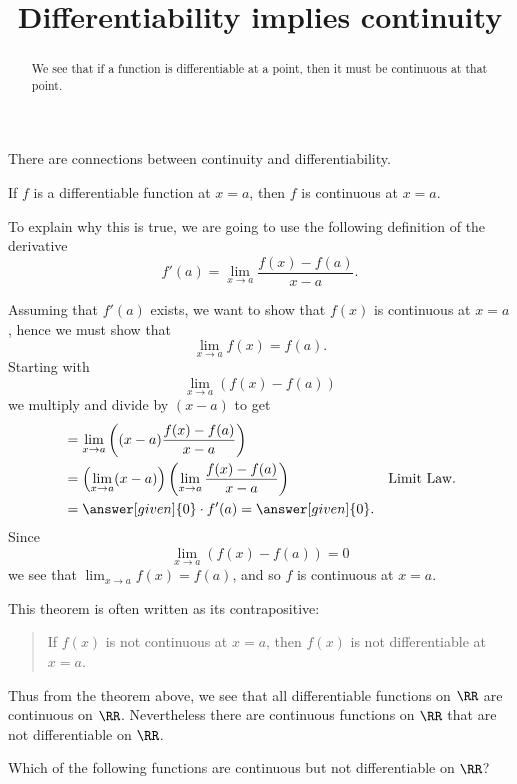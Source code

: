 \documentclass{ximera}
\title[Dig-In:]{Differentiability implies continuity}
\begin{document}
\begin{abstract}
We see that if a function is differentiable at a point, then it must
be continuous at that point.
\end{abstract}
\maketitle

There are connections between continuity and differentiability.

\begin{theorem}
If $f$ is a differentiable function at $x = a$, then $f$ is continuous
at $x=a$.
\begin{explanation}
To explain why this is true, we are going to use the following
definition of the derivative
\[
f'(a) = \lim_{x\to a} \frac{f(x)-f(a)}{x-a}.
\]

  Assuming that $f'(a)$ exists, we want to show that $f(x)$ is
continuous at $x=a$, hence we must show that
\[
\lim_{x\to a} f(x) = f(a).
\]
Starting with
\[
\lim_{x\to a} \left(f(x) - f(a)\right)
\]
we multiply and divide by $(x-a)$ to get
\begin{align*}
  &= \lim_{x\to a} \left((x-a)\frac{f(x) - f(a)}{x-a}\right) \\
  &= \left(\lim_{x\to a} (x-a) \right) \left(\lim_{x\to a}\frac{f(x) - f(a)}{x-a}\right) &\text{Limit Law.} \\
  &= \answer[given]{0}\cdot f'(a) = \answer[given]{0}.
\end{align*}
Since 
\[
\lim_{x\to a}\left(f(x) - f(a)\right) = 0 
\]
we see that $\lim_{x\to a} f(x) = f(a)$, and so $f$ is continuous at
$x=a$.
\end{explanation}
\end{theorem}

This theorem is often written as its contrapositive:
\begin{quote}
If $f(x)$ is not continuous at $x=a$, then $f(x)$ is not
differentiable at $x=a$.
\end{quote}


Thus from the theorem above, we see that all differentiable functions
on $\RR$ are continuous on $\RR$. Nevertheless there are continuous
functions on $\RR$ that are not differentiable on $\RR$.

\begin{question}
  Which of the following functions are continuous but not
  differentiable on $\RR$?
  \begin{multipleChoice}
  \end{multipleChoice}
\end{question}
\end{document}
